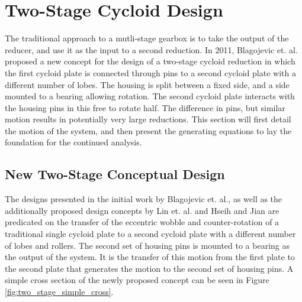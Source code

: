 \section{Two-Stage Cycloid Design} \label{ch:dual:initial_equations}

The traditional approach to a mutli-stage gearbox is to take the output of the reducer, and use it as the input to a second reduction. In 2011, Blagojevic et. al. \cite{ref:new_two_stage} proposed a new concept for the design of a two-stage cycloid reduction in which  the first cycloid plate is connected through pins to a second cycloid plate with a different number of lobes. The housing is split between a fixed side, and a side mounted to a bearing allowing rotation. The second cycloid plate interacts with the housing pins in this free to rotate half. The difference in pins, but similar motion results in potentially very large reductions. This section will first detail the motion of the system, and then present the generating equations to lay the foundation for the continued analysis. 

\subsection{New Two-Stage Conceptual Design} \label{ch:dual:initial_equation:motion}

The designs presented in the initial work by Blagojevic et. al., as well as the additionally proposed design concepts by Lin et. al. \cite{ref:two_stage_tooth_mod} and Hseih and Jian \cite{ref:hsieh_effect_2016} are predicated on the transfer of the eccentric wobble and counter-rotation of a traditional single cycloid plate to a second cycloid plate with a different number of lobes and rollers. The second set of housing pins is mounted to a bearing as the output of the system. It is the transfer of this motion from the first plate to the second plate that generates the motion to the second set of housing pins. A simple cross section of the newly proposed concept can be seen in Figure \ref{fig:two_stage_simple_cross}. 

